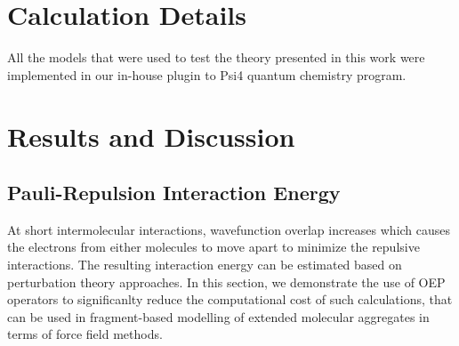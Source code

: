 \section{\label{s:4}Calculation Details}

All the models that were used to test the theory presented in this work
were implemented in our in\hyp{}house plugin to {\sc Psi4} quantum chemistry program.\cite{Psi4.JCTC.2017}

\section{\label{s:5}Results and Discussion}
\subsection{\label{ss.5.1}Pauli-Repulsion Interaction Energy}

At short intermolecular interactions, wavefunction overlap increases
which causes the electrons from either molecules to move apart to minimize the repulsive interactions.
The resulting interaction energy can be estimated based on perturbation theory approaches.
In this section, we demonstrate the use of OEP operators to significanlty reduce the computational
cost of such calculations, that can be used in fragment\hyp{}based modelling of extended molecular
aggregates in terms of force field methods.

